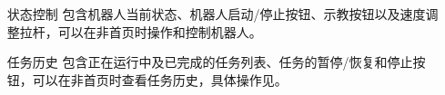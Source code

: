 \begin{itemize}[leftmargin=4.5em]
	\item [状态控制] 包含机器人当前状态、机器人启动/停止按钮、示教按钮以及速度调整拉杆，可以在非首页时操作和控制机器人。
	\item [任务历史] 包含正在运行中及已完成的任务列表、任务的暂停/恢复和停止按钮，可以在非首页时查看任务历史，具体操作见。
\end{itemize}
